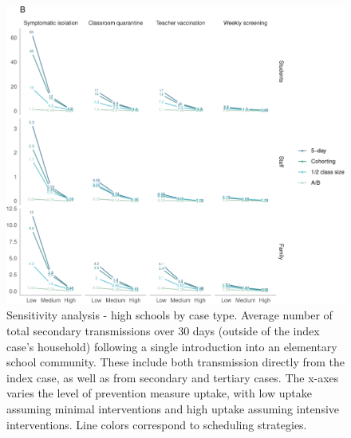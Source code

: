 \documentclass[
]{article}
\begin{document}
\begin{figure}
\centering
\includegraphics{Schools_draft_files/figure-latex/figs2-1.pdf}
\caption{\label{figs3} Sensitivity analysis - high schools by case type.
Average number of total secondary transmissions over 30 days (outside of
the index case's household) following a single introduction into an
elementary school community. These include both transmission directly
from the index case, as well as from secondary and tertiary cases. The
x-axes varies the level of prevention measure uptake, with low uptake
assuming minimal interventions and high uptake assuming intensive
interventions. Line colors correspond to scheduling strategies.}
\end{figure}
\end{document}
